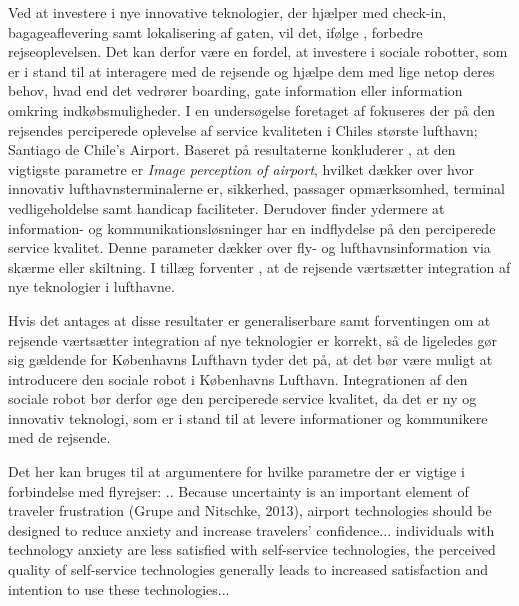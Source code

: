 Ved at investere i nye innovative teknologier, der hjælper med check-in, bagageaflevering samt lokalisering af gaten, vil det, ifølge \textcite[s. 352]{PDF:TheImpactOfTraveler}, forbedre rejseoplevelsen. Det kan derfor være en fordel, at investere i sociale robotter, som er i stand til at interagere med de rejsende og hjælpe dem med lige netop deres behov, hvad end det vedrører boarding, gate information eller information omkring indkøbsmuligheder.\blankline   
%
I en undersøgelse foretaget af \textcite{PDF:CustomerPerceptionOfService} fokuseres der på den rejsendes perciperede oplevelse af service kvaliteten i Chiles største lufthavn; Santiago de Chile's Airport. Baseret på resultaterne konkluderer \textcite[s. 213]{PDF:CustomerPerceptionOfService}, at den vigtigste parametre er \textit{Image perception of airport}, hvilket dækker over hvor innovativ lufthavnsterminalerne er, sikkerhed, passager opmærksomhed, terminal vedligeholdelse samt handicap faciliteter. Derudover finder \textcite[s. 213]{PDF:CustomerPerceptionOfService} ydermere at information- og kommunikationsløsninger har en indflydelse på den perciperede service kvalitet. Denne parameter dækker over fly- og lufthavnsinformation via skærme eller skiltning. I tillæg forventer \textcite[s. 210]{PDF:CustomerPerceptionOfService}, at de rejsende værtsætter integration af nye teknologier i lufthavne. 

Hvis det antages at disse resultater er generaliserbare samt forventingen om at rejsende værtsætter integration af nye teknologier er korrekt, så de ligeledes gør sig gældende for Københavns Lufthavn tyder det på, at det bør være muligt at introducere den sociale robot i Københavns Lufthavn. Integrationen af den sociale robot bør derfor øge den perciperede service kvalitet, da det er ny og innovativ teknologi, som er i stand til at levere informationer og kommunikere med de rejsende.  \blankline
%





Det her kan bruges til at argumentere for hvilke parametre der er vigtige i forbindelse med flyrejser: .. Because uncertainty is an important element of traveler frustration (Grupe and Nitschke, 2013), airport technologies should be designed to reduce anxiety and increase travelers' confidence... individuals with technology anxiety are less satisfied with self-service technologies, the perceived quality of self-service technologies generally leads to increased satisfaction and intention to use these technologies... \textcite[s. 352]{PDF:TheImpactOfTraveler}

